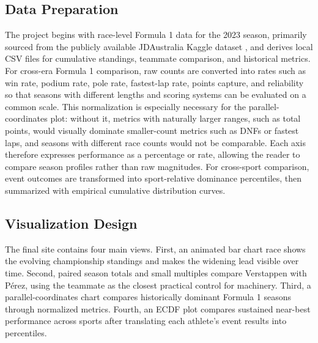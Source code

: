 \documentclass[conference]{IEEEtran}
\begin{document}
\subsection{Data Preparation}
The project begins with race-level Formula 1 data for the 2023 season, primarily sourced from the publicly available JDAustralia Kaggle dataset \cite{jdaustralia2023f1}, and derives local CSV files for cumulative standings, teammate comparison, and historical metrics. For cross-era Formula 1 comparison, raw counts are converted into rates such as win rate, podium rate, pole rate, fastest-lap rate, points capture, and reliability so that seasons with different lengths and scoring systems can be evaluated on a common scale. This normalization is especially necessary for the parallel-coordinates plot: without it, metrics with naturally larger ranges, such as total points, would visually dominate smaller-count metrics such as DNFs or fastest laps, and seasons with different race counts would not be comparable. Each axis therefore expresses performance as a percentage or rate, allowing the reader to compare season profiles rather than raw magnitudes. For cross-sport comparison, event outcomes are transformed into sport-relative dominance percentiles, then summarized with empirical cumulative distribution curves.

\subsection{Visualization Design}
The final site contains four main views. First, an animated bar chart race shows the evolving championship standings and makes the widening lead visible over time. Second, paired season totals and small multiples compare Verstappen with P\'erez, using the teammate as the closest practical control for machinery. Third, a parallel-coordinates chart compares historically dominant Formula 1 seasons through normalized metrics. Fourth, an ECDF plot compares sustained near-best performance across sports after translating each athlete's event results into percentiles.
\end{document}
